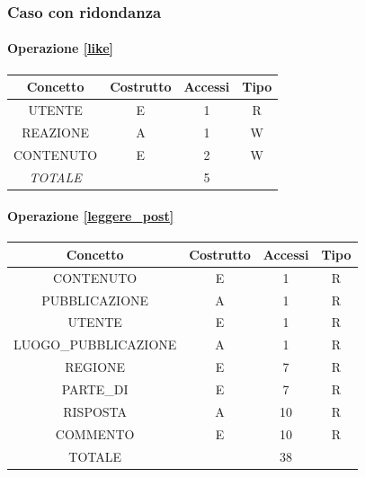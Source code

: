 \documentclass[a4paper,12pt]{report}
\begin{document}
\subsubsection{Caso con ridondanza}
\begin{table}[H]
\paragraph{Operazione \ref{like}\newline}
\begin{tabular}{|c|c|c|c|}
\hline
Concetto        & Costrutto & Accessi & Tipo \\ \hline
UTENTE          & E         & 1       & R    \\ \hline
REAZIONE        & A         & 1       & W    \\ \hline
CONTENUTO       & E         & 2       & W    \\ \hline
\textit{TOTALE} &           & 5       &      \\ \hline
\end{tabular}
\end{table}
\begin{table}[H]
\paragraph{Operazione \ref{leggere_post}\newline}
\begin{tabular}{|c|c|c|c|}
\hline
Concetto             & Costrutto & Accessi & Tipo \\ \hline
CONTENUTO            & E         & 1       & R    \\ \hline
PUBBLICAZIONE        & A         & 1       & R    \\ \hline
UTENTE               & E         & 1       & R    \\ \hline
LUOGO\_PUBBLICAZIONE & A         & 1       & R    \\ \hline
REGIONE              & E         & 7       & R    \\ \hline
PARTE\_DI            & E         & 7       & R    \\ \hline
RISPOSTA             & A         & 10      & R    \\ \hline
COMMENTO             & E         & 10      & R    \\ \hline
TOTALE               &           & 38      &      \\ \hline
\end{tabular}
\end{table}
\end{document}
